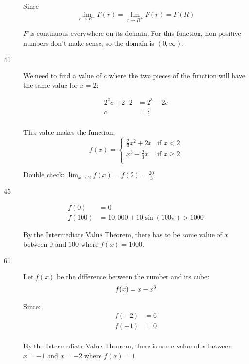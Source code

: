 \documentclass[letterpaper, landscape]{exam}
\begin{document}
\begin{description}
        Since
        \[
          \lim_{r \to R^-} F(r) = \lim_{r \to R^+} F(r) = F(R)
        \]

        $F$ is continuous everywhere on its domain. For this function, non-positive
        numbers don't make sense, so the domain is $(0, \infty)$.

      \item[41]
        We need to find a value of $c$ where the two pieces of the function will have the
        same value for $x = 2$:

        \begin{align*}
          2^2 c + 2 \cdot 2 & = 2^3 - 2c \\
          c                 & = \boxed{ \frac{2}{3} } \\
        \end{align*}

        This value makes the function:
        \[
          f(x) = 
            \begin{cases}
              \frac{2}{3} x^2 + 2x & \text{if } x < 2 \\
              x^3 - \frac{2}{3} x  & \text{if } x \geq 2 \\
            \end{cases}
        \]

        Double check: $\lim_{x \to 2} f(x) = f(2) = \frac{20}{3}$

      \item[45]
        \begin{align*}
          f(0) &= 0 \\
          f(100) &= 10,000 + 10 \sin (100 \pi) > 1000
        \end{align*}

        By the Intermediate Value Theorem, there has to be some value of $x$ between
        $0$ and $100$ where $f(x) = 1000$.

      \item[61]
        Let $f(x)$ be the difference between the number and its cube:
        \[
          f(x) = x - x^3  \\
        \]

        Since:
        \begin{align*}
          f(-2) &= 6 \\
          f(-1) &= 0 \\
        \end{align*}

        By the Intermediate Value Theorem, there is some value of $x$ between $x = -1$ and
        $x = -2$ where $f(x) = 1$


\end{description}
\end{document}
